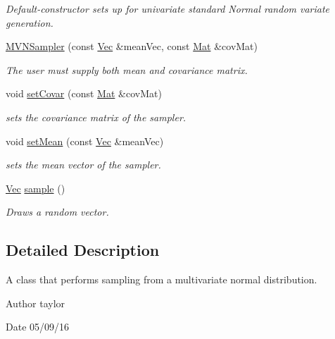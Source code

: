 \begin{DoxyCompactItemize}
\begin{DoxyCompactList}\small\item\em Default-\/constructor sets up for univariate standard Normal random variate generation. \end{DoxyCompactList}\item 
\hyperlink{classdensities_1_1MVNSampler_ad4892d5a5018163f4b69974c4b80b4ea}{M\+V\+N\+Sampler} (const \hyperlink{apf__filter_8h_a4c7df05c6f5e8a0d15ae14bcdbc07152}{Vec} \&mean\+Vec, const \hyperlink{apf__filter_8h_ae601f56a556993079f730483c574356f}{Mat} \&cov\+Mat)
\begin{DoxyCompactList}\small\item\em The user must supply both mean and covariance matrix. \end{DoxyCompactList}\item 
void \hyperlink{classdensities_1_1MVNSampler_a914d6a896a1b7946085732a5758c16bb}{set\+Covar} (const \hyperlink{apf__filter_8h_ae601f56a556993079f730483c574356f}{Mat} \&cov\+Mat)
\begin{DoxyCompactList}\small\item\em sets the covariance matrix of the sampler. \end{DoxyCompactList}\item 
void \hyperlink{classdensities_1_1MVNSampler_a456f1e8ed39efc34ee3a7667dfb2011c}{set\+Mean} (const \hyperlink{apf__filter_8h_a4c7df05c6f5e8a0d15ae14bcdbc07152}{Vec} \&mean\+Vec)
\begin{DoxyCompactList}\small\item\em sets the mean vector of the sampler. \end{DoxyCompactList}\item 
\hyperlink{apf__filter_8h_a4c7df05c6f5e8a0d15ae14bcdbc07152}{Vec} \hyperlink{classdensities_1_1MVNSampler_a6be29ab6518db1f6457e95469e6970a4}{sample} ()
\begin{DoxyCompactList}\small\item\em Draws a random vector. \end{DoxyCompactList}\end{DoxyCompactItemize}


\subsection{Detailed Description}
A class that performs sampling from a multivariate normal distribution. 

\begin{DoxyAuthor}{Author}
taylor 
\end{DoxyAuthor}
\begin{DoxyDate}{Date}
05/09/16 
\end{DoxyDate}


